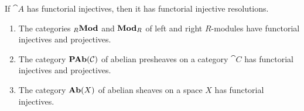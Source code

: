 \documentclass[../main.tex]{subfiles}
\begin{document}
\begin{rmk}
    If $\cat A$ has functorial injectives, then it has functorial injective resolutions. 
\end{rmk}

\begin{thm}
    \begin{enumerate}
        \item\label{thm:modules-functorial-injectives-projectives} The categories $\catLeftModule[R]$ and $\catRightModule[R]$ of left and right \(R\)-modules have functorial injectives and projectives.
        \item\label{thm:presheaf-functorial-injectives-projectives} The category $\operatorname{\mathbf{PAb}}(\mathcal{C})$ of abelian presheaves on a category \(\cat C\) has functorial injectives and projectives.
        \item\label{thm:sheaf-functorial-injectives} The category $\operatorname{\mathbf{Ab}}(X)$ of abelian sheaves on a space \(X\) has functorial injectives.
    \end{enumerate}
\end{thm}
\end{document}
